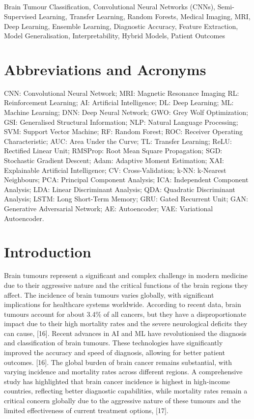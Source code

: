 \documentclass[conference]{IEEEtran}
\begin{document}
\subsection*{}
\begin{IEEEkeywords}
Brain Tumour Classification, Convolutional Neural Networks (CNNs), Semi-Supervised Learning, Transfer Learning, Random Forests, Medical Imaging, MRI, Deep Learning, Ensemble Learning, Diagnostic Accuracy, Feature Extraction, Model Generalisation, Interpretability, Hybrid Models, Patient Outcomes
\end{IEEEkeywords}

\section*{Abbreviations and Acronyms}\label{AA}
CNN: Convolutional Neural Network; MRI: Magnetic Resonance Imaging
RL: Reinforcement Learning; AI: Artificial Intelligence; DL: Deep Learning; ML: Machine Learning; DNN: Deep Neural Network; GWO: Grey Wolf Optimization; GSI: Generalised Structural Information; NLP: Natural Language Processing; SVM: Support Vector Machine; RF: Random Forest; ROC: Receiver Operating Characteristic; AUC: Area Under the Curve; TL: Transfer Learning; ReLU: Rectified Linear Unit; RMSProp: Root Mean Square Propagation; SGD: Stochastic Gradient Descent; Adam: Adaptive Moment Estimation; XAI: Explainable Artificial Intelligence; CV: Cross-Validation; k-NN: k-Nearest Neighbours; PCA: Principal Component Analysis; ICA: Independent Component Analysis; LDA: Linear Discriminant Analysis; QDA: Quadratic Discriminant Analysis; LSTM: Long Short-Term Memory; GRU: Gated Recurrent Unit; GAN: Generative Adversarial Network; AE: Autoencoder; VAE: Variational Autoencoder.

\section{Introduction}
Brain tumours represent a significant and complex challenge in modern medicine due to their aggressive nature and the critical functions of the brain regions they affect. The incidence of brain tumours varies globally, with significant implications for healthcare systems worldwide. According to recent data, brain tumours account for about 3.4\% of all cancers, but they have a disproportionate impact due to their high mortality rates and the severe neurological deficits they can cause, [16]. Recent advances in AI and ML have revolutionised the diagnosis and classification of brain tumours. These technologies have significantly improved the accuracy and speed of diagnosis, allowing for better patient outcomes. [16]. The global burden of brain cancer remains substantial, with varying incidence and mortality rates across different regions. A comprehensive study has highlighted that brain cancer incidence is highest in high-income countries, reflecting better diagnostic capabilities, while mortality rates remain a critical concern globally due to the aggressive nature of these tumours and the limited effectiveness of current treatment options, [17].
\end{document}

